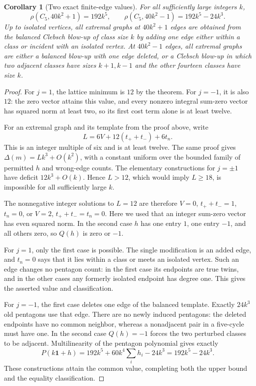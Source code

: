 \documentclass[11pt]{amsart}
\newtheorem{corollary}[theorem]{Corollary}
\theoremstyle{definition}
\theoremstyle{remark}
\begin{document}
\begin{corollary}[Two exact finite-edge values]
\label{cor:two-exact-offsets}
For all sufficiently large integers $k$,
\[
 \rho(C_5,40k^2+1)=192k^5,\qquad
 \rho(C_5,40k^2-1)=192k^5-24k^3.
\]
Up to isolated vertices, all extremal graphs at $40k^2+1$ edges are
obtained from the balanced Clebsch blow-up of class size $k$ by adding
one edge either within a class or incident with an isolated vertex. At
$40k^2-1$ edges, all extremal graphs are either a balanced blow-up with
one edge deleted, or a Clebsch blow-up in which two adjacent classes
have sizes $k+1,k-1$ and the other fourteen classes have size $k$.
\end{corollary}
\begin{proof}
For $j=1$, the lattice minimum is $12$ by the theorem. For $j=-1$, it is
also $12$: the zero vector attains this value, and every nonzero integral
sum-zero vector has squared norm at least two, so its first cost term
alone is at least twelve.

For an extremal graph and its template from the proof above, write
\[
 L=6V+12(t_++t_-)+6t_n.
\]
This is an integer multiple of six and is at least twelve. The same
proof gives $\Delta(m)=Lk^3+O(k^2)$, with a constant uniform over the
bounded family of permitted $h$ and wrong-edge counts. The elementary
constructions for $j=\pm1$ have deficit $12k^3+O(k)$. Hence $L>12$,
which would imply $L\geq18$, is impossible for all sufficiently large
$k$.

The nonnegative integer solutions to $L=12$ are therefore
$V=0$, $t_++t_-=1$, $t_n=0$, or $V=2$, $t_++t_-=t_n=0$. Here we used
that an integer sum-zero vector has even squared norm. In the second
case $h$ has one entry $1$, one entry $-1$, and all others zero, so
$Q(h)$ is zero or $-1$.

For $j=1$, only the first case is possible. The single modification is
an added edge, and $t_n=0$ says that it lies within a class or meets an
isolated vertex. Such an edge changes no pentagon count: in the first
case its endpoints are true twins, and in the other cases any formerly
isolated endpoint has degree one. This gives the asserted value and
classification.

For $j=-1$, the first case deletes one edge of the balanced template.
Exactly $24k^3$ old pentagons use that edge. There are no newly induced
pentagons: the deleted endpoints have no common neighbor, whereas a
nonadjacent pair in a five-cycle must have one. In the second case
$Q(h)=-1$ forces the two perturbed classes to be adjacent.
Multilinearity of the pentagon polynomial gives exactly
\[
 P(k\mathbf1+h)=192k^5+60k^4\sum_i h_i-24k^3=192k^5-24k^3.
\]
These constructions attain the common value, completing both the upper
bound and the equality classification.
\end{proof}
\end{document}
